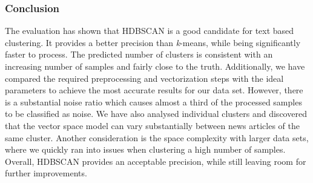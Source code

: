 \subsubsection{Conclusion}
\label{subsubsec:5a_conclusion}

The evaluation has shown that HDBSCAN is a good candidate for text based clustering.
It provides a better precision than \textit{k}-means, while being significantly faster to process.
The predicted number of clusters is consistent with an increasing number of samples and fairly close to the truth.
Additionally, we have compared the required preprocessing and vectorization steps with the ideal parameters
to achieve the most accurate results for our data set.
However, there is a substantial noise ratio which causes almost a third of the processed samples
to be classified as noise.
We have also analysed individual clusters and discovered that the vector space model
can vary substantially between news articles of the same cluster.
Another consideration is the space complexity with larger data sets,
where we quickly ran into issues when clustering a high number of samples.
Overall, HDBSCAN provides an acceptable precision, while still leaving room for further improvements.
